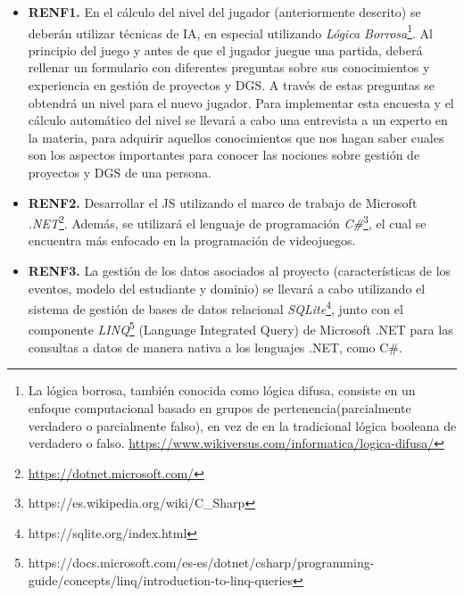 \begin{itemize}
	\item \textbf{RENF1.} En el cálculo del nivel del jugador (anteriormente descrito) se deberán utilizar técnicas de IA, en especial utilizando \emph{Lógica Borrosa}\footnote{La lógica borrosa, también conocida como lógica difusa, consiste en un enfoque computacional basado en grupos de pertenencia(parcialmente verdadero o parcialmente falso), en vez de en la tradicional lógica booleana de verdadero o falso. \url{https://www.wikiversus.com/informatica/logica-difusa/}}. Al principio del juego y antes de que el jugador juegue una partida, deberá rellenar un formulario con diferentes preguntas sobre sus conocimientos y experiencia en gestión de proyectos y DGS. A través de estas preguntas se obtendrá un nivel para el nuevo jugador. Para implementar esta encuesta y el cálculo automático del nivel se llevará a cabo una entrevista a un experto en la materia, para adquirir aquellos conocimientos que nos hagan saber cuales son los aspectos importantes para conocer las nociones sobre gestión de proyectos y DGS de una persona.
	
	\item \textbf{RENF2.} Desarrollar el JS utilizando el marco de trabajo de Microsoft \emph{.NET}\footnote{\url{https://dotnet.microsoft.com/}}. Además, se utilizará el lenguaje de programación \emph{C\#}\footnote{https://es.wikipedia.org/wiki/C\_Sharp}, el cual se encuentra más enfocado en la programación de videojuegos.
	
	\item \textbf{RENF3.} La gestión de los datos asociados al proyecto (características de los eventos, modelo del estudiante y dominio) se llevará a cabo utilizando el sistema de gestión de bases de datos relacional \emph{SQLite}\footnote{https://sqlite.org/index.html}, junto con el componente \emph{LINQ}\footnote{https://docs.microsoft.com/es-es/dotnet/csharp/programming-guide/concepts/linq/introduction-to-linq-queries} (Language Integrated Query) de Microsoft .NET para las consultas a datos de manera nativa a los lenguajes .NET, como C\#.
\end{itemize}

